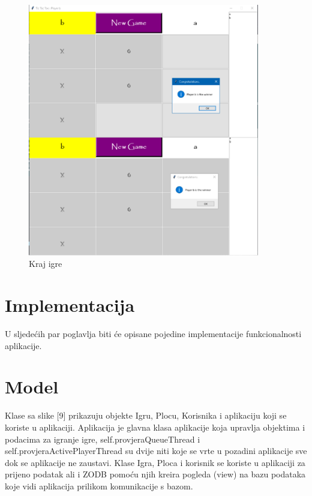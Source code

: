 \documentclass[]{foi} %
\begin{document}
\begin{figure}[]
    \centering
    \includegraphics[width=0.9\textwidth]{slike/igranje_4.png}
    \caption{Kraj igre \cite{Vlastita izrada}}
    \label{fig:podjela}
\end{figure}




\section{Implementacija}


U sljedećih par poglavlja biti će opisane pojedine implementacije funkcionalnosti aplikacije. 


\section{Model}


Klase sa slike [9] prikazuju objekte Igru, Plocu, Korisnika i aplikaciju koji se koriste u aplikaciji. Aplikacija je glavna klasa aplikacije koja upravlja objektima i podacima za igranje igre, self.provjeraQueueThread i self.provjeraActivePlayerThread su dvije niti koje se vrte u pozadini aplikacije sve dok se aplikacije ne zaustavi. Klase Igra, Ploca i korisnik se koriste u aplikaciji za prijeno podatak ali i ZODB pomoću njih kreira pogleda (view) na bazu podataka koje vidi aplikacija prilikom komunikacije s bazom. 
\end{document}
